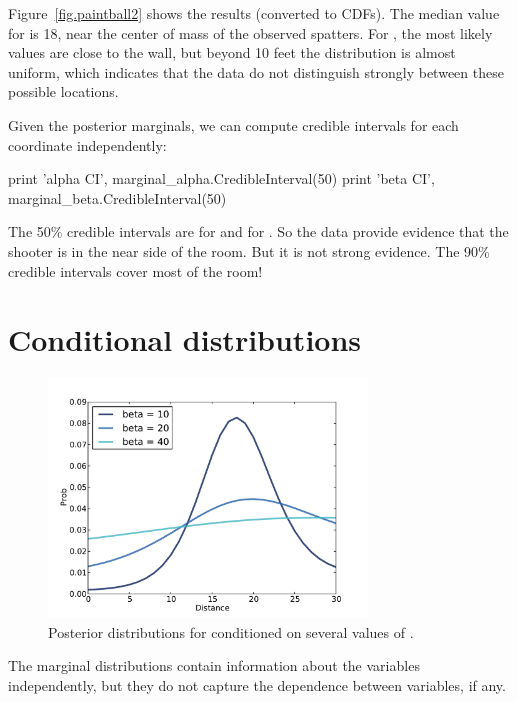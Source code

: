 \documentclass[12pt]{book}
\theoremstyle{exercise}
\begin{document}
Figure~\ref{fig.paintball2} shows the results (converted to CDFs).
The median value for  is 18, near the center of mass of
the observed spatters.  For , the most likely values are
close to the wall, but beyond 10 feet the distribution is almost
uniform, which indicates that the data do not distinguish strongly
between these possible locations.

Given the posterior marginals, we can compute credible intervals
for each coordinate independently:

\begin{code}
    print 'alpha CI', marginal_alpha.CredibleInterval(50)
    print 'beta CI', marginal_beta.CredibleInterval(50)
\end{code}

The 50\% credible intervals are  for  and
 for .  So the data provide evidence that the
shooter is in the near side of the room.  But it is not strong
evidence.  The 90\% credible intervals cover most of the room!


\section{Conditional distributions}
\label{conditional}

\begin{figure}
\centerline{\includegraphics[height=2.5in]{figs/paintball3.pdf}}
\caption{Posterior distributions for  conditioned on several values
of .}
\label{fig.paintball3}
\end{figure}

The marginal distributions contain information about the variables
independently, but they do not capture the dependence between
variables, if any.
\end{document}
